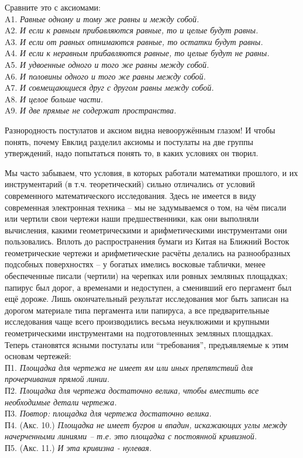 Сравните это с аксиомами:
\\
A1. {\it Равные одному и тому же равны и между собой. }
\\
A2. {\it И если к равным прибавляются равные, то и целые будут равны.}
\\
A3. {\it И если от равных отнимаются равные, то остатки будут равны.}
\\
A4. {\it И если к неравным прибавляются равные, то целые будут не равны.}
\\
A5. {\it  И удвоенные одного и того же равны между собой.}
\\
A6. {\it И половины одного и того же равны между собой.}
\\
A7. {\it  И совмещающиеся друг с другом равны между собой.}
\\
A8. {\it И целое больше части.}
\\
A9. {\it И две прямые не содержат пространства.}

Разнородность постулатов и аксиом видна невооружённым глазом!
И чтобы понять, почему Евклид разделил аксиомы и постулаты на две группы утверждений, надо попытаться понять то, в каких условиях он творил.

Мы часто забываем, что условия, в которых работали математики прошлого, и их инструментарий (в т.ч. теоретический) сильно отличались от условий современного математического исследования.
Здесь не имеется в виду современная электронная техника -- мы не задумываемся о том, на чём писали или чертили свои чертежи наши предшественники, как они выполняли вычисления, какими геометрическими и арифметическими инструментами они пользовались.
Вплоть до распространения бумаги из Китая на Ближний Восток геометрические чертежи и арифметические расчёты делались на разнообразных подсобных поверхностях -- у богатых имелись восковые таблички, менее обеспеченные писали (чертили) на черепках или ровных земляных пло\-щад\-ках; папирус был дорог, а временами и недоступен, а сменивший его пергамент был ещё дороже.
Лишь окончательный результат исследования мог быть записан на дорогом материале типа пергамента или папируса, а все предварительные исследования чаще всего  производились весьма неуклюжими и крупными геометрическими инструментами на подготовленных земляных площадках.
Теперь становятся ясными постулаты или ``требования'', предъявляемые к этим основам чертежей:
\\
П1. {\it Площадка для чертежа не имеет ям или иных препятствий для прочерчивания прямой линии.}
\\
П2. {\it Пло\-щад\-ка для чер\-те\-жа до\-ста\-точ\-но ве\-ли\-ка, что\-бы \linebreak вмес\-тить все необходимые детали чертежа.}
\\
П3. {\it Повтор: площадка для чертежа достаточно велика.}
\\
П4. (Акс. 10.) {\it  Площадка не имеет бугров и впадин, искажающих углы между начерченными линиями -- т.е. это площадка с постоянной кривизной.}
\\
П5. (Акс. 11.) {\it  И эта кривизна - нулевая.}

